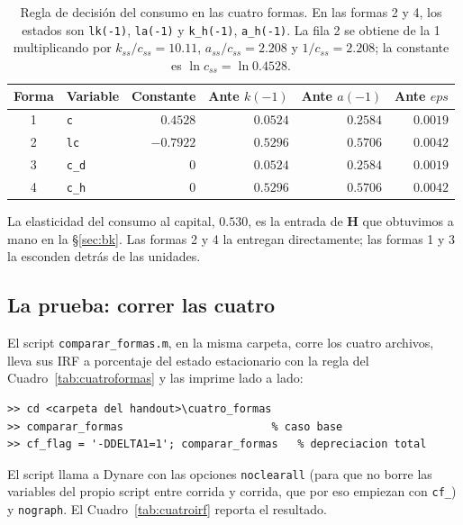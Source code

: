 \documentclass[11pt,a4paper]{report}
\newcommand{\code}[1]{\texttt{#1}}
\begin{document}
\begin{table}[H]
\centering\small
\begin{tabular}{clrrrr}
\toprule
\textbf{Forma} & \textbf{Variable} & \textbf{Constante} & \textbf{Ante $k(-1)$} & \textbf{Ante $a(-1)$} & \textbf{Ante $eps$}\\
\midrule
1 & \code{c}   & $0.4528$  & $0.0524$ & $0.2584$ & $0.0019$\\
2 & \code{lc}  & $-0.7922$ & $0.5296$ & $0.5706$ & $0.0042$\\
3 & \code{c\_d} & $0$      & $0.0524$ & $0.2584$ & $0.0019$\\
4 & \code{c\_h} & $0$      & $0.5296$ & $0.5706$ & $0.0042$\\
\bottomrule
\end{tabular}
\caption{Regla de decisión del consumo en las cuatro formas. En las formas 2 y 4, los
estados son \code{lk(-1)}, \code{la(-1)} y \code{k\_h(-1)}, \code{a\_h(-1)}. La fila 2
se obtiene de la 1 multiplicando por $k_{ss}/c_{ss}=10.11$, $a_{ss}/c_{ss}=2.208$ y
$1/c_{ss}=2.208$; la constante es $\ln c_{ss}=\ln 0.4528$.}
\label{tab:cuatropol}
\end{table}

\noindent La elasticidad del consumo al capital, $0.530$, es la entrada de
$\mathbf{H}$ que obtuvimos a mano en la \S\ref{sec:bk}. Las formas 2 y 4 la entregan
directamente; las formas 1 y 3 la esconden detrás de las unidades.

\subsection{La prueba: correr las cuatro}

El script \code{comparar\_formas.m}, en la misma carpeta, corre los cuatro archivos,
lleva sus IRF a porcentaje del estado estacionario con la regla del
Cuadro~\ref{tab:cuatroformas} y las imprime lado a lado:

\begin{lstlisting}[numbers=none,basicstyle=\ttfamily\footnotesize]
>> cd <carpeta del handout>\cuatro_formas
>> comparar_formas                       % caso base
>> cf_flag = '-DDELTA1=1'; comparar_formas   % depreciacion total
\end{lstlisting}

\noindent El script llama a Dynare con las opciones \code{noclearall} (para que no
borre las variables del propio script entre corrida y corrida, que por eso empiezan
con \code{cf\_}) y \code{nograph}. El Cuadro~\ref{tab:cuatroirf} reporta el resultado.
\end{document}
